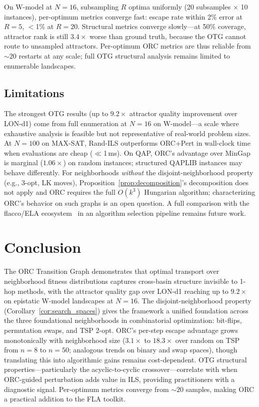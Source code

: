 \documentclass[runningheads]{llncs}
\begin{document}
On W-model at $N\!=\!16$, subsampling $R$ optima uniformly (20 subsamples $\times$ 10 instances), per-optimum metrics converge fast: escape rate within 2\% error at $R\!=\!5$, $<$1\% at $R\!=\!20$.
Structural metrics converge slowly---at 50\% coverage, attractor rank is still $3.4\times$ worse than ground truth, because the OTG cannot route to unsampled attractors.
Per-optimum ORC metrics are thus reliable from ${\sim}20$ restarts at any scale; full OTG structural analysis remains limited to enumerable landscapes.

\subsection{Limitations}
\label{sec:limitations}

The strongest OTG results (up to $9.2\times$ attractor quality improvement over LON-d1) come from full enumeration at $N\!=\!16$ on W-model---a scale where exhaustive analysis is feasible but not representative of real-world problem sizes.
At $N\!=\!100$ on MAX-SAT, Rand-ILS outperforms ORC+Pert in wall-clock time when evaluations are cheap ($\ll$1\,ms).
On QAP, ORC's advantage over MinGap is marginal ($1.06\times$) on random instances; structured QAPLIB instances may behave differently.
For neighborhoods \emph{without} the disjoint-neighborhood property (e.g., 3-opt, LK moves), Proposition~\ref{prop:decomposition}'s decomposition does not apply and ORC requires the full $O(k^3)$ Hungarian algorithm; characterizing ORC's behavior on such graphs is an open question.
A full comparison with the flacco/ELA ecosystem~\cite{mersmann2011exploratory} in an algorithm selection pipeline remains future work.


\FloatBarrier
\enlargethispage{2\baselineskip}
\section{Conclusion}
\label{sec:conclusion}

The ORC Transition Graph demonstrates that optimal transport over neighborhood fitness distributions captures cross-basin structure invisible to 1-hop methods, with the attractor quality gap over LON-d1 reaching up to $9.2\times$ on epistatic W-model landscapes at $N\!=\!16$.
The disjoint-neighborhood property (Corollary~\ref{cor:search_spaces}) gives the framework a unified foundation across the three foundational neighborhoods in combinatorial optimization: bit-flips, permutation swaps, and TSP 2-opt.
ORC's per-step escape advantage grows monotonically with neighborhood size ($3.1\times$ to $18.3\times$ over random on TSP from $n\!=\!8$ to $n\!=\!50$; analogous trends on binary and swap spaces), though translating this into algorithmic gains remains cost-dependent.
OTG structural properties---particularly the acyclic-to-cyclic crossover---correlate with when ORC-guided perturbation adds value in ILS, providing practitioners with a diagnostic signal.
Per-optimum metrics converge from ${\sim}20$ samples, making ORC a practical addition to the FLA toolkit.
\end{document}
